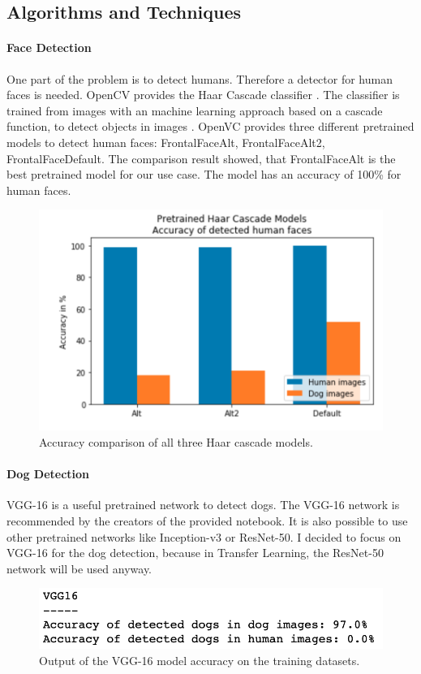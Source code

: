 \documentclass{article}
\begin{document}
\subsection{Algorithms and Techniques} \label{su_alg_and_techn}
\paragraph{Face Detection} One part of the problem is to detect humans. Therefore a detector for human faces is needed. OpenCV provides the Haar Cascade classifier \cite{haar_cascade}. The classifier is trained from images with an machine learning approach based on a cascade function, to detect objects in images \cite{opencv}. OpenVC provides three different pretrained models to detect human faces: FrontalFaceAlt, FrontalFaceAlt2, FrontalFaceDefault. The comparison result showed, that FrontalFaceAlt is the best pretrained model for our use case. The model has an accuracy of 100\% for human faces.
\begin{figure}[h]
    \centering
    \includegraphics[scale=0.45]{./images/haar_cascades_results}
    \caption{Accuracy comparison of all three Haar cascade models.}
    \label{fig:haar_cascace_comp}
\end{figure}

\paragraph{Dog Detection} VGG-16 is a useful pretrained network to detect dogs. The VGG-16 network is recommended by the creators of the provided notebook. It is also possible to use other pretrained networks like Inception-v3 or ResNet-50. I decided to focus on VGG-16 for the dog detection, because in Transfer Learning, the ResNet-50 network will be used anyway.
\begin{figure}[h]
    \centering
    \includegraphics[scale=0.45]{./images/vgg16_dog_detector}
    \caption{Output of the VGG-16 model accuracy on the training datasets.}
    \label{fig:dog_detection_acc}
\end{figure}
\end{document}
